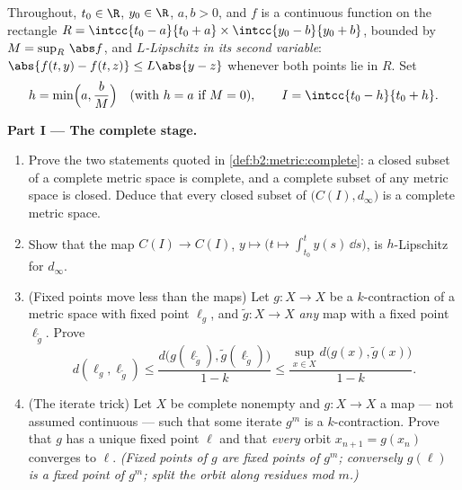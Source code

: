 \begin{problem}
\label{pb:b2:metric:1}
Throughout, $t_0 \in \R$, $y_0 \in \R$, $a, b > 0$, and $f$ is a
continuous function on the rectangle $R = \intcc{t_0 - a}{t_0 +
a} \times \intcc{y_0 - b}{y_0 + b}$, bounded by $M =
\sup_R\,\abs f$, and \emph{$L$-Lipschitz in its second variable}:
$\abs{f(t, y) - f(t, z)} \leq L\abs{y - z}$ whenever both points
lie in $R$. Set
\[
h = \min\Bigl(a, \frac bM\Bigr) \quad (\text{with } h = a
\text{ if } M = 0), \qquad I = \intcc{t_0 - h}{t_0 + h}.
\]

\medskip
\noindent\textbf{Part I --- The complete stage.}
\begin{enumerate}
  \item Prove the two statements quoted in
        \cref{def:b2:metric:complete}: a closed subset of a
        complete metric space is complete, and a complete subset
        of any metric space is closed. Deduce that every closed
        subset of $\bigl(C(I), d_\infty\bigr)$ is a complete
        metric space.
  \item Show that the map $C(I) \to C(I)$, $y \mapsto \bigl(t
        \mapsto \int_{t_0}^{t}y(s)\,\dd s\bigr)$, is
        $h$-Lipschitz for $d_\infty$.
  \item (Fixed points move less than the maps) Let $g \colon X
        \to X$ be a $k$-contraction of a metric space with fixed
        point $\ell_g$, and $\widetilde g \colon X \to X$
        \emph{any} map with a fixed point $\ell_{\widetilde g}$.
        Prove
        \[
        d(\ell_g, \ell_{\widetilde g}) \leq
        \frac{d\bigl(g(\ell_{\widetilde g}),
        \widetilde g(\ell_{\widetilde g})\bigr)}{1 - k}
        \leq \frac{\sup_{x \in X} d\bigl(g(x), \widetilde
        g(x)\bigr)}{1 - k}.
        \]
  \item (The iterate trick) Let $X$ be complete nonempty and $g
        \colon X \to X$ a map --- not assumed continuous ---
        such that some iterate $g^m$ is a $k$-contraction.
        Prove that $g$ has a unique fixed point $\ell$ and that
        \emph{every} orbit $x_{n+1} = g(x_n)$ converges to
        $\ell$. \emph{(Fixed points of $g$ are fixed points of
        $g^m$; conversely $g(\ell)$ is a fixed point of $g^m$;
        split the orbit along residues mod $m$.)}
\end{enumerate}


\end{problem}
